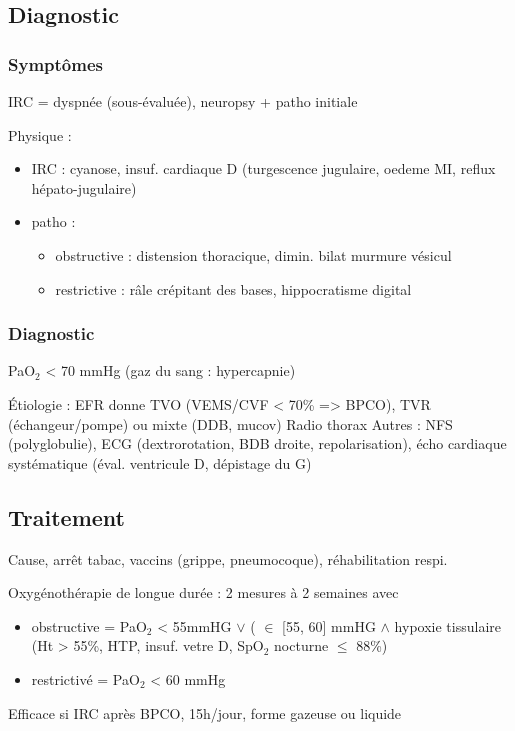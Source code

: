 \subsection{Diagnostic}
\label{sec:orgf8776e2}
\subsubsection{Symptômes}
\label{sec:org35a8cf3}
IRC = dyspnée (sous-évaluée), neuropsy + patho initiale

Physique : 
\begin{itemize}
\item IRC : cyanose, insuf. cardiaque D (turgescence jugulaire, oedeme MI, reflux
hépato-jugulaire)
\item patho : 
\begin{itemize}
\item obstructive : distension thoracique, dimin. bilat murmure vésicul
\item restrictive : râle crépitant des bases, hippocratisme digital
\end{itemize}
\end{itemize}

\subsubsection{Diagnostic}
\label{sec:org7599c0f}
PaO\(_{\text{2}}\) < 70 mmHg (gaz du sang : hypercapnie)

Étiologie : EFR donne TVO (VEMS/CVF < 70\% => BPCO), TVR (échangeur/pompe) ou
mixte (DDB, mucov)
Radio thorax
Autres : NFS (polyglobulie), ECG (dextrorotation, BDB droite, repolarisation),
écho cardiaque systématique (éval. ventricule D, dépistage du G)

\subsection{Traitement}
\label{sec:org870a2d5}
Cause, arrêt tabac, vaccins (grippe, pneumocoque), réhabilitation respi.

Oxygénothérapie de longue durée : 2 mesures à 2 semaines avec
\begin{itemize}
\item obstructive = PaO\(_{\text{2}}\) < 55mmHG \(\vee\) ( \(\in\) [55, 60] mmHG \(\wedge\) hypoxie
tissulaire (Ht > 55\%, HTP, insuf. vetre D, SpO\(_{\text{2}}\) nocturne \(\le\) 88\%)
\item restrictivé = PaO\(_{\text{2}}\) < 60 mmHg
\end{itemize}
Efficace si  IRC après BPCO, 15h/jour, forme gazeuse ou liquide

